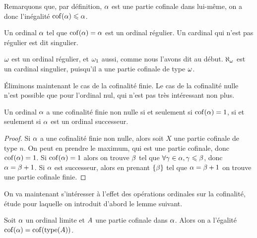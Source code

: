 Remarquons que, par définition, $\alpha$ est une partie cofinale dans lui-même,
on a donc l'inégalité $\operatorname{cof}(\alpha) \leqslant \alpha$.

\begin{definition}
  Un ordinal $\alpha$ tel que $\operatorname{cof}(\alpha) = \alpha$ est un ordinal régulier.
  Un cardinal qui n'est pas régulier est dit singulier.
\end{definition}

\begin{example}
  $\omega$ est un ordinal régulier, et $\omega_1$ aussi, comme nous l'avons dit
  au début. $\aleph_\omega$ est un cardinal singulier, puisqu'il a une partie
  cofinale de type $\omega$.
\end{example}

\'Eliminons maintenant le cas de la cofinalité finie. Le cas de la cofinalité
nulle n'est possible que pour l'ordinal nul, qui n'est pas très intéressant non
plus.

\begin{proposition}
  Un ordinal $\alpha$ a une cofinalité finie non nulle si et seulement si
  $\operatorname{cof}(\alpha) = 1$, si et seulement si $\alpha$ est un ordinal successeur.
\end{proposition}

\begin{proof}
  Si $\alpha$ a une cofinalité finie non nulle, alors soit $X$ une partie
  cofinale de type $n$. On peut en prendre le maximum, qui est une partie
  cofinale, donc $\operatorname{cof}(\alpha) = 1$. Si $\operatorname{cof}(\alpha) = 1$ alors on trouve
  $\beta$ tel que $\forall \gamma \in \alpha, \gamma \leqslant \beta$, donc
  $\alpha = \beta + 1$. Si $\alpha$ est successeur, alors en prenant
  $\{\beta\}$ tel que $\alpha = \beta + 1$ on trouve une partie cofinale
  finie.
\end{proof}

On va maintenant s'intéresser à l'effet des opérations ordinales sur la
cofinalité, étude pour laquelle on introduit d'abord le lemme suivant.

\begin{lemma}\label{lem.cof.type}
  Soit $\alpha$ un ordinal limite et $A$ une partie cofinale dans $\alpha$.
  Alors on a l'égalité $\operatorname{cof}(\alpha) = \operatorname{cof}(\operatorname{type}(A))$.
\end{lemma}

